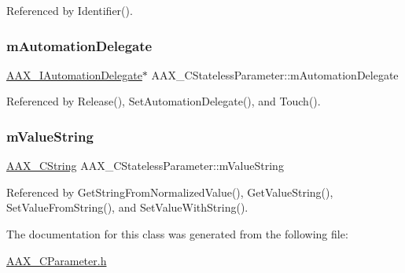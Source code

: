 Referenced by Identifier().

\mbox{\label{a01541_ae5a1336d5b23ab6d72756eb14d14a517}} 
\subsubsection{\texorpdfstring{mAutomationDelegate}{mAutomationDelegate}}
{\footnotesize\ttfamily \mbox{\hyperlink{a01773}{A\+A\+X\+\_\+\+I\+Automation\+Delegate}}$\ast$ A\+A\+X\+\_\+\+C\+Stateless\+Parameter\+::m\+Automation\+Delegate\hspace{0.3cm}{\ttfamily [protected]}}



Referenced by Release(), Set\+Automation\+Delegate(), and Touch().

\mbox{\label{a01541_ad9d69aab224d8a96250611b0961c75d1}} 
\subsubsection{\texorpdfstring{mValueString}{mValueString}}
{\footnotesize\ttfamily \mbox{\hyperlink{a01573}{A\+A\+X\+\_\+\+C\+String}} A\+A\+X\+\_\+\+C\+Stateless\+Parameter\+::m\+Value\+String\hspace{0.3cm}{\ttfamily [protected]}}



Referenced by Get\+String\+From\+Normalized\+Value(), Get\+Value\+String(), Set\+Value\+From\+String(), and Set\+Value\+With\+String().



The documentation for this class was generated from the following file\+:\begin{DoxyCompactItemize}
\item 
\mbox{\hyperlink{a00455}{A\+A\+X\+\_\+\+C\+Parameter.\+h}}\end{DoxyCompactItemize}
